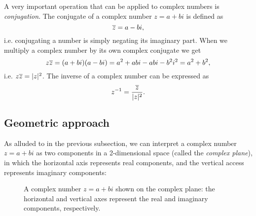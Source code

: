 A very important operation that can be applied to complex numbers is \emph{conjugation}. The conjugate of a complex number $z=a+bi$ is defined as
\begin{equation}
	\overline{z} = a-bi,
	\label{eq:complex_conjugation}
\end{equation}
i.e. conjugating a number is simply negating its imaginary part. When we multiply a complex number by its own complex conjugate we get
\begin{equation}
	z\overline{z} = (a+bi)(a-bi) = a^{2} + abi - abi - b^{2}i^{2} = a^{2}+b^{2},
	\label{eq:conjugate_product}
\end{equation}
i.e. $z\overline{z} = |z|^{2}$. The inverse of a complex number can be expressed as
\begin{equation}
	z^{-1} = \frac{\overline{z}}{|z|^{2}}.
	\label{eq:complex_inverse}
\end{equation}

\subsection{Geometric approach}
As alluded to in the previous subsection, we can interpret a complex number $z=a+bi$ as two components in a 2-dimensional space (called the \emph{complex plane}), in which the horizontal axis represents real components, and the vertical access represents imaginary components:
\begin{figure}
	\centering
	\caption{A complex number $z=a+bi$ shown on the complex plane: the horizontal and vertical axes represent the real and imaginary components, respectively.}
	\label{fig:complex number}
\end{figure}

